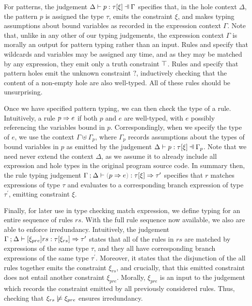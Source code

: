  For patterns, the judgement $\chpattyp{p}{\tau}{\xi}{\Gamma}{\Delta}$ specifies that, in the hole context $\Delta$, the pattern $p$ is assigned the type $\tau$, emits the constraint $\xi$, and makes typing assumptions about bound variables as recorded in the expression context $\Gamma$. Note that, unlike in any other of our typing judgements, the expression context $\Gamma$ is morally an output for pattern typing rather than an input. Rules \PTVar and \PTWild specify that wildcards and variables may be assigned any time, and as they may be matched by any expression, they emit only a truth constraint $\top$. Rules \PTEHole and \PTHole specify that pattern holes emit the unknown constraint $?$, inductively checking that the content of a non-empty hole are also well-typed. All of these rules should be unsurprising.
 
 Once we have specified pattern typing, we can then check the type of a rule. Intuitively, a rule $p \Rightarrow e$ if both $p$ and $e$ are well-typed, with $e$ possibly referencing the variables bound in $p$. Correspondingly, when we specify the type of $e$, we use the context $\Gamma \uplus \Gamma_p$, where $\Gamma_p$ records assumptions about the types of bound variables in $p$ as emitted by the judgement $\chpattyp{p}{\tau}{\xi}{\Gamma_p}{\Delta}$. Note that we need never extend the context $\Delta$, as we assume it to already include all expression and hole types in the original program source code. In summary then, the rule typing judgement $\chrultyp{\Gamma}{\Delta}{\hrulP{p}{e}}{\tau}{\xi}{\tau'}$ specifies that $r$ matches expressions of type $\tau$ and evaluates to a corresponding branch expression of type $\tau^\prime$, emitting constraint $\xi$.
 
 Finally, for later use in type checking match expression, we define typing for an entire sequence of rules $rs$. With the full rule sequence now available, we also are able to enforce irredundancy. Intuitively, the judgement $\Gamma \mathbin{;} \Delta \vdash [\xi_{pre}] rs : \tau [\xi_{rs}] \Rightarrow \tau'$ states that all of the rules in $rs$ are matched by expressions of the same type $\tau$, and they all have corresponding branch expressions of the same type $\tau^\prime$. Moreover, it states that the disjunction of the all rules together emits the constraint $\xi_{rs}$, and crucially, that this emitted constraint does not entail another constraint $\xi_{pre}$. Morally, $\xi_{pre}$ is an input to the judgement which records the constraint emitted by all previously considered rules. Thus, checking that $\cnotsatisfy{\xi_{rs}}{\xi_{pre}}$ ensures irredundancy.
 
